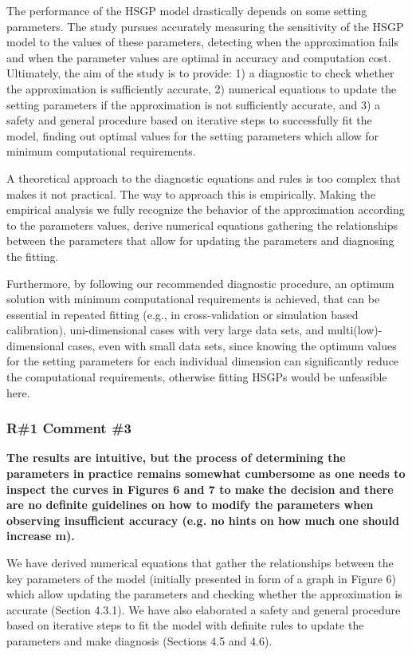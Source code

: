 \documentclass[11pt]{report}
\begin{document}
The performance of the HSGP model drastically depends on some setting parameters. The study pursues accurately measuring the sensitivity of the HSGP model to the values of these parameters, detecting when the approximation fails and when the parameter values are optimal in accuracy and computation cost. Ultimately, the aim of the study is to provide: 1) a diagnostic to check whether the approximation is sufficiently accurate, 2) numerical equations to update the setting parameters if the approximation is not sufficiently accurate, and 3) a safety and general procedure based on iterative steps to successfully fit the model, finding out optimal values for the setting parameters which allow for minimum computational requirements.

A theoretical approach to the diagnostic equations and rules is too complex that makes it not practical. The way to approach this is empirically. Making the empirical analysis we fully recognize the behavior of the approximation according to the parameters values, derive numerical equations gathering the relationships between the parameters that allow for updating the parameters and diagnosing the fitting.

Furthermore, by following our recommended diagnostic procedure, an optimum solution with minimum computational requirements is achieved, that can be essential in repeated fitting (e.g., in cross-validation or simulation based calibration), uni-dimensional cases with very large data sets, and multi(low)-dimensional cases, even with small data sets, since knowing the optimum values for the setting parameters for each individual dimension can significantly reduce the computational requirements, otherwise fitting HSGPs would be unfeasible here.

\subsubsection*{R\#1 Comment \#3}

\textbf{The results are intuitive, but the process of determining the parameters in practice remains somewhat cumbersome as one needs to inspect the curves in Figures 6 and 7 to make the decision and there are no definite guidelines on how to modify the parameters when observing insufficient accuracy (e.g. no hints on how much one should increase m).}

We have derived numerical equations that gather the relationships between the key parameters of the model (initially presented in form of a graph in Figure 6) which allow updating the parameters and checking whether the approximation is accurate (Section 4.3.1). We have also elaborated a safety and general procedure based on iterative steps to fit the model with definite rules to update the parameters and make diagnosis (Sections 4.5 and 4.6).
\end{document}
